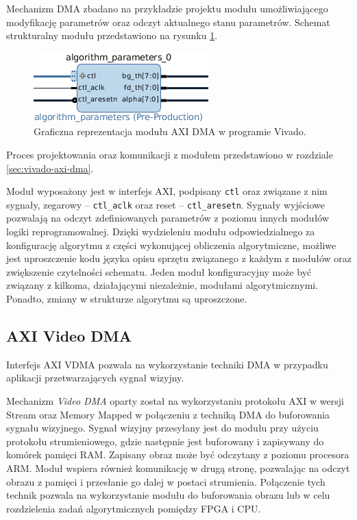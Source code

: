 Mechanizm DMA zbadano na przykładzie projektu modułu umożliwiającego modyfikację parametrów oraz odczyt aktualnego stanu parametrów. 
Schemat strukturalny modułu przedstawiono na rysunku \ref{fig:axi-dma-diagram}.

\begin{figure}[h]
	\centering
	\includegraphics[]{img/algorithm-parameters.png}
	\caption{Graficzna reprezentacja modułu AXI DMA w programie Vivado.}
	\label{fig:axi-dma-diagram}
\end{figure}

Proces projektowania oraz komunikacji z modułem przedstawiono w rozdziale \ref{sec:vivado-axi-dma}. %

Moduł wyposażony jest w interfejs AXI, podpisany \texttt{ctl} oraz związane z nim sygnały, zegarowy -- \texttt{ctl\_aclk} oraz reset -- \texttt{ctl\_aresetn}. 
Sygnały wyjściowe pozwalają na odczyt zdefiniowanych parametrów z poziomu innych modułów logiki reprogramowalnej. 
Dzięki wydzieleniu modułu odpowiedzialnego za konfigurację algorytmu z części wykonującej obliczenia algorytmiczne, możliwe jest uproszczenie kodu języka opisu sprzętu związanego z każdym z modułów oraz zwiększenie czytelności schematu. 
Jeden moduł konfiguracyjny może być związany z kilkoma, działającymi niezależnie, modułami algorytmicznymi. 
Ponadto, zmiany w strukturze algorytmu są uproszczone.


\subsection{AXI Video DMA}
\label{sec:axi-vdma}
Interfejs AXI VDMA pozwala na wykorzystanie techniki DMA w przypadku aplikacji przetwarzających sygnał wizyjny. %

Mechanizm \emph{Video DMA} oparty został na wykorzystaniu protokołu AXI w wersji Stream oraz Memory Mapped w połączeniu z techniką DMA do buforowania sygnału wizyjnego. 
Sygnał wizyjny przesyłany jest do modułu przy użyciu protokołu strumieniowego, gdzie następnie jest buforowany i zapisywany do komórek pamięci RAM. %
Zapisany obraz może być odczytany z poziomu procesora ARM. %
Moduł wspiera również komunikację w drugą stronę, pozwalając na odczyt obrazu z pamięci i przesłanie go dalej w postaci strumienia. 
Połączenie tych technik pozwala na wykorzystanie modułu do buforowania obrazu lub w celu rozdzielenia zadań algorytmicznych pomiędzy FPGA i CPU.

